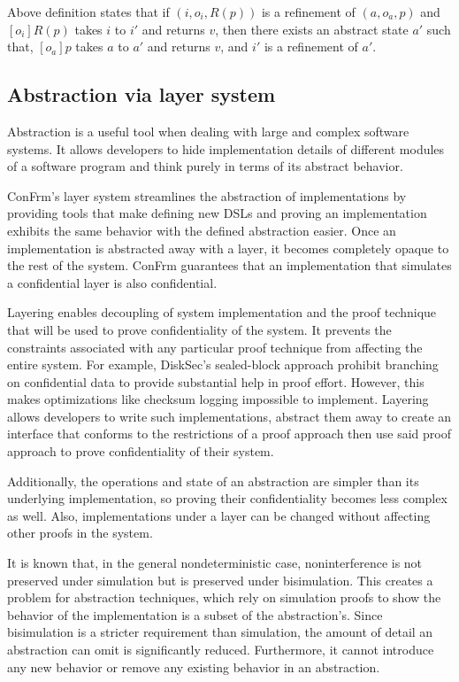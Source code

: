 Above definition states that if $(i, o_i, R(p))$ is a refinement of $(a, o_a, p)$ and $[o_i]R(p)$ takes $i$ to $i'$ and returns $v$, then there exists an abstract state $a'$ such that, $[o_a]p$ takes $a$ to $a'$ and returns $v$, and $i'$ is a refinement of $a'$.

\subsection{Abstraction via layer system}
Abstraction is a useful tool when dealing with large and complex software systems.
It allows developers to hide implementation details of different modules of a software program and think purely in terms of its abstract behavior.

ConFrm's layer system streamlines the abstraction of implementations by providing tools that make defining new DSLs and proving an implementation exhibits the same behavior with the defined abstraction easier. Once an implementation is abstracted away with a layer, it becomes completely opaque to the rest of the system. ConFrm guarantees that an implementation that simulates a confidential layer is also confidential.

Layering enables decoupling of system implementation and the proof technique that will be used to prove confidentiality of the system. It prevents the constraints associated with any particular proof technique from affecting the  entire system. For example, DiskSec's sealed-block approach prohibit branching on confidential data to provide substantial help in proof effort. However, this makes optimizations like checksum logging impossible to implement. Layering allows developers to write such implementations, abstract them away to create an interface that conforms to the restrictions of a proof approach then use said proof approach to prove confidentiality of their system.

Additionally, the operations and state of an abstraction are simpler than its underlying implementation, so proving their confidentiality becomes less complex as well. Also, implementations under a layer can be changed without affecting other proofs in the system.

It is known that, in the general nondeterministic case, noninterference is not preserved under simulation but is preserved under bisimulation. This creates a problem for abstraction techniques, which rely on simulation proofs to show the behavior of the implementation is a subset of the abstraction's. Since bisimulation is a stricter requirement than simulation, the amount of detail an abstraction can omit is significantly reduced. Furthermore, it cannot introduce any new behavior or remove any existing behavior in an abstraction.

